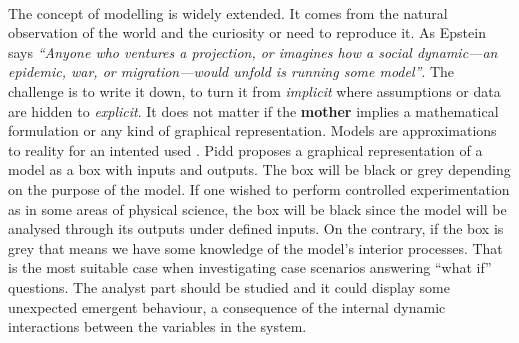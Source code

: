 \documentclass{report}
\begin{document}
\\
The concept of modelling is widely extended. It comes from the natural observation of the world and the curiosity or need to reproduce it.
As Epstein \cite{Epstein2008} says \textit{“Anyone who ventures a projection, or imagines how a social 
dynamic—an epidemic, war, or migration—would unfold is running some model”}. The challenge is to write it down, to turn it from \textit{implicit} where assumptions or data are hidden to \textit{explicit}. It does not matter if the \textbf{mother} implies a mathematical formulation or any kind of graphical representation. Models are approximations to reality for an intented used \cite{Pidd2010}. Pidd proposes a graphical representation of a model as a box with inputs and outputs. The box will be black or grey depending on the purpose of the model. If one wished to perform controlled experimentation as in some areas of physical science, the box will be black since the model will be analysed through its outputs under defined inputs. On the contrary, if the box is grey that means we have some knowledge of the model's interior processes. That is the most suitable case when investigating case scenarios answering ``what if'' questions. The analyst part should be studied and it could display some unexpected emergent behaviour, a consequence of the internal dynamic interactions between the variables in the system. \\
\end{document}
